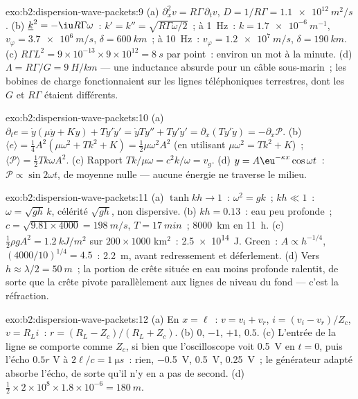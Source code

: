 \begin{solution}{exo:b2:dispersion-wave-packets:9}
(a) $\partial_x^2v = R\Gamma\,\partial_tv$, $D = 1/R\Gamma = \qty{1.1e12}{m^2/s}$. (b) $\underline k^2
= -\iu R\Gamma\omega$~: $k' = k'' = \sqrt{R\Gamma\omega/2}$~; à \qty{1}{Hz}~: $k = \qty{1.7e-6}{m^{-1}}$,
$v_\varphi = \qty{3.7e6}{m/s}$, $\delta = \qty{600}{km}$~; à \qty{10}{Hz}~: $v_\varphi = \qty{1.2e7}{m/s}$,
$\delta = \qty{190}{km}$. (c) $R\Gamma L^2 = 9 \times 10^{-13} \times 9 \times 10^{12} = \qty{8}{s}$
par point~: environ un mot à la minute. (d) $\Lambda = R\Gamma/G = \qty{9}{H/km}$ --- une
inductance absurde pour un câble sous-marin~; les bobines de charge fonctionnaient sur les lignes
téléphoniques terrestres, dont les $G$ et $R\Gamma$ étaient différents.
\end{solution}

\begin{solution}{exo:b2:dispersion-wave-packets:10}
(a) $\partial_te = \dot y(\mu\ddot y + Ky) + Ty'\dot y' = \dot yTy'' + Ty'\dot y' = \partial_x
(Ty'\dot y) = -\partial_x\mathcal P$. (b) $\langle e\rangle = \tfrac14A^2(\mu\omega^2 + Tk^2 + K) =
\tfrac12\mu\omega^2A^2$ (en utilisant $\mu\omega^2 = Tk^2 + K$)~; $\langle\mathcal P\rangle = \tfrac12Tk\omega
A^2$. (c) Rapport $Tk/\mu\omega = c^2k/\omega = v_g$. (d) $y = A\eu^{-\kappa x}\cos\omega t$~:
$\mathcal P \propto \sin2\omega t$, de moyenne nulle --- aucune énergie ne traverse le milieu.
\end{solution}

\begin{solution}{exo:b2:dispersion-wave-packets:11}
(a) $\tanh kh \to 1$~: $\omega^2 = gk$~; $kh \ll 1$~: $\omega = \sqrt{gh}\,k$, célérité $\sqrt{gh}$,
non dispersive. (b) $kh = 0.13$~: eau peu profonde~; $c = \sqrt{9.81 \times 4000} = \qty{198}{m/s}$,
$T = \qty{17}{min}$~; \qty{8000}{km} en \qty{11}{h}. (c) $\tfrac12\rho gA^2 = \qty{1.2}{kJ/m^2}$
sur $200 \times 1000$ km$^2$~: \qty{2.5e14}{J}. Green~: $A \propto h^{-1/4}$, $(4000/10)^{1/4}
= 4.5$~: \qty{2.2}{m}, avant redressement et déferlement. (d) Vers $h \approx \lambda/2 =
\qty{50}{m}$~; la portion de crête située en eau moins profonde ralentit, de sorte que la
crête pivote parallèlement aux lignes de niveau du fond --- c'est la réfraction.
\end{solution}

\begin{solution}{exo:b2:dispersion-wave-packets:12}
(a) En $x = \ell$~: $v = v_i + v_r$, $i = (v_i - v_r)/Z_c$, $v = R_Li$~: $r = (R_L -
Z_c)/(R_L + Z_c)$. (b) $0$, $-1$, $+1$, $0.5$. (c) L'entrée de la ligne se comporte comme
$Z_c$, si bien que l'oscilloscope voit \qty{0.5}{V} en $t = 0$, puis l'écho $0.5r$ V à
$2\ell/c = \qty{1}{\micro s}$~: rien, \qty{-0.5}{V}, \qty{+0.5}{V}, \qty{+0.25}{V}~; le
générateur adapté absorbe l'écho, de sorte qu'il n'y en a pas de second. (d)
$\tfrac12 \times 2 \times 10^8 \times 1.8 \times 10^{-6} = \qty{180}{m}$.
\end{solution}

